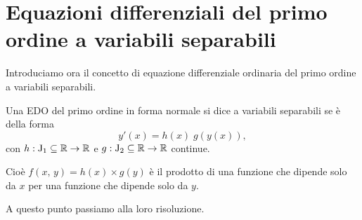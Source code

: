 \documentclass[../../analisi2]{subfiles}
\begin{document}
    \chapter{Equazioni differenziali del primo ordine a variabili separabili}
    \label{cap:edoSeparabili}

        Introduciamo ora il concetto di equazione differenziale ordinaria del primo ordine a variabili separabili.

        \begin{definizione}
            Una EDO del primo ordine in forma normale si dice a variabili separabili se è della forma
            \[
                y'(x) = h(x) \; g(y(x)),
            \]
            con \(h : \mathrm{J}_1 \subseteq \mathbb{R} \to \mathbb{R}\) e \(g : \mathrm{J}_2 \subseteq \mathbb{R} \to \mathbb{R}\) continue.

            Cioè \(f(x, \, y) = h(x) \times g(y)\) è il prodotto di una funzione che dipende solo da \(x\) per una funzione che dipende solo
            da \(y\).
        \end{definizione}

        A questo punto passiamo alla loro risoluzione.
\end{document}
